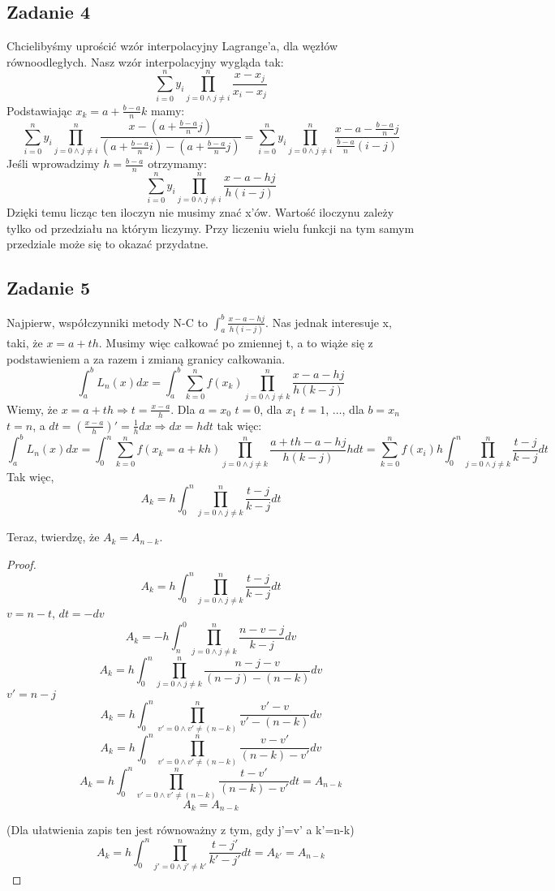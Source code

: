 \documentclass[a4paper]{article}
\begin{document}
\subsection*{Zadanie 4}
Chcielibyśmy uprościć wzór interpolacyjny Lagrange'a, dla węzłów równoodległych. Nasz wzór interpolacyjny wygląda tak:
$$\sum\limits_{i=0}^n y_i \prod_{j=0 \wedge j\neq i}^n \frac{x-x_j}{x_i-x_j} $$
Podstawiając $x_k=a+\frac{b-a}{n} k$ mamy:
$$\sum\limits_{i=0}^n y_i \prod_{j=0 \wedge j\neq i}^n \frac{x-(a+\frac{b-a}{n} j)}{(a+\frac{b-a}{n} i)-(a+\frac{b-a}{n} j)} = \sum\limits_{i=0}^n y_i \prod_{j=0 \wedge j\neq i}^n \frac{x-a-\frac{b-a}{n} j}{\frac{b-a}{n} (i - j)} $$
Jeśli wprowadzimy $h=\frac{b-a}{n}$ otrzymamy:
$$\sum\limits_{i=0}^n y_i \prod_{j=0 \wedge j\neq i}^n \frac{x-a-h j}{h (i - j)}$$
Dzięki temu licząc ten iloczyn nie musimy znać x'ów. Wartość iloczynu zależy tylko od przedziału na którym liczymy. Przy liczeniu wielu funkcji na tym samym przedziale może się to okazać przydatne.

\subsection*{Zadanie 5}
Najpierw, współczynniki metody N-C to $\int_a^b \frac{x-a-h j}{h (i - j)}$. Nas jednak interesuje x, taki, że $x=a+th$. Musimy więc całkować po zmiennej t, a to wiąże się z podstawieniem a za razem i zmianą granicy całkowania.
$$\int_a^b L_n(x) dx = \int_a^b  \sum\limits_{k=0}^n f(x_k) \prod_{j=0 \wedge j\neq k}^n \frac{x-a-h j}{h (k - j)}$$
Wiemy, że $x=a+th \Rightarrow t=\frac{x-a}{h}$. Dla $a=x_0$ $t=0$, dla $x_1$ $t=1$, $\dots$, dla $b=x_n$ $t=n$, a $dt=(\frac{x-a}{h})'=\frac{1}{h}dx \Rightarrow dx=hdt$ tak więc:
$$\int_a^b L_n(x) dx = \int_0^n  \sum\limits_{k=0}^n f(x_k=a+kh) \prod_{j=0 \wedge j\neq k}^n \frac{a+th-a-h j}{h (k - j)} hdt = \sum\limits_{k=0}^n f(x_i)h \int_0^n  \prod_{j=0 \wedge j\neq k}^n \frac{t - j}{k - j} dt$$
Tak więc, $$A_k=h \int_0^n  \prod_{j=0 \wedge j\neq k}^n \frac{t - j}{k - j} dt$$

Teraz, twierdzę, że $A_k=A_{n-k}$.
\begin{proof}
$$A_k=h \int_0^n  \prod_{j=0 \wedge j\neq k}^n \frac{t - j}{k - j} dt$$
$v=n-t$, $dt=-dv$
$$A_k=-h \int_n^0  \prod_{j=0 \wedge j\neq k}^n \frac{n-v - j}{k - j} dv $$
$$A_k=h \int_0^n  \prod_{j=0 \wedge j\neq k}^n \frac{n - j - v}{(n - j) - (n - k)} dv $$
$v'=n-j$
$$A_k=h \int_0^n  \prod_{v'=0 \wedge v'\neq (n-k)}^n  \frac{v' - v}{v' - (n-k)} dv  $$
$$A_k=h \int_0^n  \prod_{v'=0 \wedge v'\neq (n-k)}^n  \frac{v - v'}{(n-k)-v'} dv  $$
$$A_k=h \int_0^n  \prod_{v'=0 \wedge v'\neq (n-k)}^n  \frac{t - v'}{(n-k)-v'} dt  = A_{n-k}$$
$$A_k=A_{n-k}$$

(Dla ułatwienia zapis ten jest równoważny z tym, gdy j'=v' a k'=n-k)
$$A_k=h \int_0^n  \prod_{j'=0 \wedge j'\neq k'}^n  \frac{t - j'}{k'-j'} dt  = A_{k'}=A_{n-k}$$
\end{proof}
\end{document}
